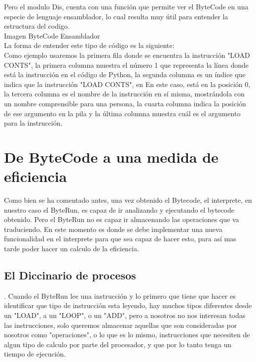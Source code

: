 Pero el modulo Dis, cuenta con una función que permite ver el ByteCode en una especie de lenguaje ensamblador, lo cual resulta muy útil para entender la estructura del codigo.\\

Imagen ByteCode Ensamblador\\

La forma de entender este tipo de código es la siguiente:\\

Como ejemplo usaremos la primera fila donde se encuentra la instrucción "LOAD CONTS", la primera columna muestra el número 1 que representa la línea donde está la instrucción en el código de Python, la segunda columna es un índice que indica que la instrucción "LOAD CONTS", en En este caso, está en la posición 0, la tercera columna es el nombre de la instrucción en sí misma, mostrándola con un nombre comprensible para una persona, la cuarta columna indica la posición de ese argumento en la pila y la última columna muestra cuál es el argumento para la instrucción.\\




\section{De ByteCode a una medida de eficiencia}

Como bien se ha comentado antes, una vez obtenido el Bytecode, el interprete, en nuestro caso el ByteRun, es capaz de ir analizando y ejecutando el bytecode obtenido. Pero el ByteRun no es capaz ir almacenando las operaciones que va traduciendo. En este momento es donde se debe implementar una nueva funcionalidad en el interprete para que sea capaz de hacer esto, para así mas tarde poder hacer un calculo de la eficiencia.

\subsection{El Diccinario de procesos}.
Cuando el ByteRun lee una instrucción y lo primero que tiene que hacer es identificar que tipo de instrucción esta leyendo, hay muchos tipos diferentes desde un "LOAD", a un "LOOP", o un "ADD", pero a nosotros no nos interesan todas las instrucciones, solo queremos almacenar aquellas que son consideradas por nosotros como "operaciones", o lo que es lo mismo, instrucciones que necesiten de algun tipo de calculo por parte del procesador, y que por lo tanto tenga un tiempo de ejecución.\\

